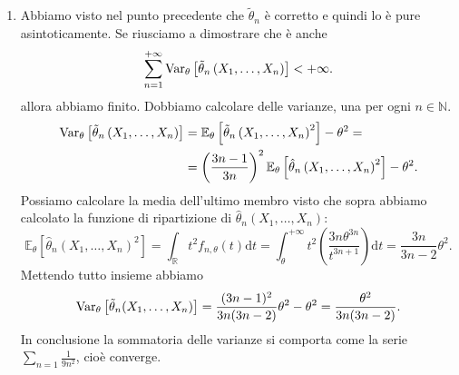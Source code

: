 \begin{soluzione}
\begin{enumerate}
  \item Abbiamo visto nel punto precedente che \(\tilde\theta_n\) è
    corretto e quindi lo è pure asintoticamente. Se riusciamo a
    dimostrare che è anche
    \[
      \sum_{n = 1}^{+\infty} \operatorname{Var}_\theta \left[ \tilde \theta_n\left(
          X_1, \dots{}, X_n \right) \right] < +\infty .
    \]
    allora abbiamo finito. Dobbiamo calcolare delle varianze, una per
    ogni \(n \in \mathbb{N}\).
    \begin{align*}
      \operatorname{Var}_\theta \left[ \tilde\theta_n \left( X_1, \dots{}, X_n \right) \right]
      &= \mathbb{E}_\theta \left[ \tilde \theta_n\left(X_1, \dots{}, X_n \right)^2 \right] - \theta^2 = \\
      &= \left(\frac{3n-1}{3n}\right)^2 \mathbb{E}_\theta \left[ \hat\theta_n\left(X_1, \dots{}, X_n\right)^2 \right] - \theta^2 .
    \end{align*}
    Possiamo calcolare la media dell'ultimo membro visto che sopra
    abbiamo calcolato la funzione di ripartizione di
    \(\hat\theta_n(X_1, \dots{}, X_n)\):
    \[
      \mathbb{E}_\theta \left[ \hat\theta_n\left(X_1, \dots{},
          X_n\right)^2 \right] = \int_{\mathbb{R}} t^2 f_{n,
        \theta}(t) \mathrm d t = \int_\theta^{+\infty} t^2
      \left(\frac{3n \theta^{3n}}{t^{3n+1}} \right) \mathrm d t =
      \frac{3n}{3n-2} \theta^2 .
    \]
    Mettendo tutto insieme abbiamo
    \[
      \operatorname{Var}_\theta \left[ \tilde\theta_n(X_1, \dots{}, X_n) \right] =
      \frac{(3n-1)^2}{3n(3n-2)}\theta^2 -\theta^2 =
      \frac{\theta^2}{3n(3n-2)} .
    \]
    In conclusione la sommatoria delle varianze si comporta come la
    serie \(\sum_{n=1} \frac{1}{9n^2}\), cioè converge.
    

\end{enumerate}
\end{soluzione}
